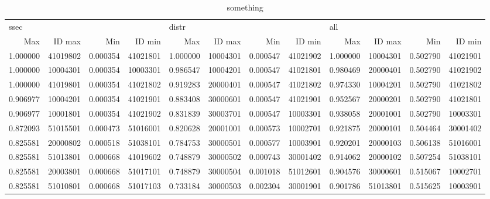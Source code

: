 \documentclass[11pt, titlepage]{article}
\begin{document}
\begin{landscape}
\begin{table}
			\begin{tabular}{rrrrrrrrrrrr}
				\toprule
				\multicolumn{4}{l}{ssec} & \multicolumn{4}{l}{distr} & \multicolumn{4}{l}{all} \\
					 Max &   ID max &      Min &   ID min &      Max &   ID max &      Min &   ID min &      Max &   ID max &      Min &   ID min \\
				\midrule
				1.000000 & 41019802 & 0.000354 & 41021801 & 1.000000 & 10004301 & 0.000547 & 41021902 & 1.000000 & 10004301 & 0.502790 & 41021901 \\
				1.000000 & 10004301 & 0.000354 & 10003301 & 0.986547 & 10004201 & 0.000547 & 41021801 & 0.980469 & 20000401 & 0.502790 & 41021902 \\
				1.000000 & 41019801 & 0.000354 & 41021802 & 0.919283 & 20000401 & 0.000547 & 41021802 & 0.974330 & 10004201 & 0.502790 & 41021802 \\
				0.906977 & 10004201 & 0.000354 & 41021901 & 0.883408 & 30000601 & 0.000547 & 41021901 & 0.952567 & 20000201 & 0.502790 & 41021801 \\
				0.906977 & 10001801 & 0.000354 & 41021902 & 0.831839 & 30003701 & 0.000547 & 10003301 & 0.938058 & 20001001 & 0.502790 & 10003301 \\
				0.872093 & 51015501 & 0.000473 & 51016001 & 0.820628 & 20001001 & 0.000573 & 10002701 & 0.921875 & 20000101 & 0.504464 & 30001402 \\
				0.825581 & 20000802 & 0.000518 & 51038101 & 0.784753 & 30000501 & 0.000577 & 10003901 & 0.920201 & 20000103 & 0.506138 & 51016001 \\
				0.825581 & 51013801 & 0.000668 & 41019602 & 0.748879 & 30000502 & 0.000743 & 30001402 & 0.914062 & 20000102 & 0.507254 & 51038101 \\
				0.825581 & 20003801 & 0.000668 & 51017101 & 0.748879 & 30000504 & 0.001018 & 51012601 & 0.904576 & 30000601 & 0.515067 & 10002701 \\
				0.825581 & 51010801 & 0.000668 & 51017103 & 0.733184 & 30000503 & 0.002304 & 30001901 & 0.901786 & 51013801 & 0.515625 & 10003901 \\
				\bottomrule
				\end{tabular}
	\caption{something}
	\label{minmax}
	\end{table}		
			
			
			
		
		
		
\end{landscape}
\end{document}
